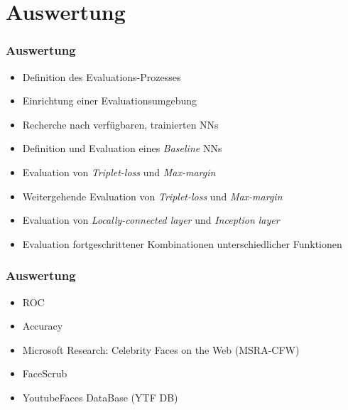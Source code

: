 \section{Auswertung}
\begin{frame}
	\frametitle{Auswertung}
		\begin{itemize}
			\item Definition des Evaluations-Prozesses
			\item Einrichtung einer Evaluationsumgebung
			\item Recherche nach verf\"ugbaren, trainierten NNs
			\item Definition und Evaluation eines \textit{Baseline} NNs
			\item Evaluation von \textit{Triplet-loss} und \textit{Max-margin}
		\end{itemize}
		\vspace{0.3cm}
		\begin{itemize}
			\item Weitergehende Evaluation von \textit{Triplet-loss} und \textit{Max-margin} 
			\item Evaluation von \textit{Locally-connected layer} und \textit{Inception layer}
			\item Evaluation fortgeschrittener Kombinationen unterschiedlicher Funktionen
		\end{itemize}

\end{frame}
	
	
\begin{frame}
	\frametitle{Auswertung}
	\begin{itemize}
		\item ROC
		\item Accuracy
	\end{itemize}
	
	\bigskip
	
	\begin{itemize}
		\item Microsoft Research: Celebrity Faces on the Web (MSRA-CFW)
		\item FaceScrub
		\item YoutubeFaces DataBase (YTF DB)
	\end{itemize}
\end{frame}
